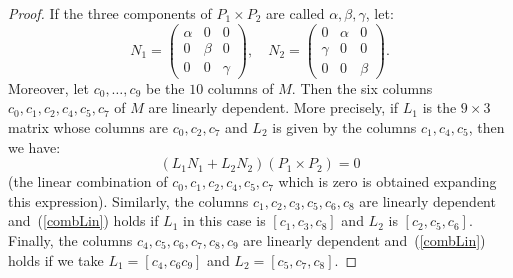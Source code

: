 \documentclass{amsart}
\theoremstyle{plain}
\theoremstyle{definition}
\begin{document}
\begin{proof}
If the three components of $P_1 \times P_2$ are called $\alpha, \beta, \gamma$, let:
%
\[
  N_1 = \left(
  \begin{array}{ccc}
    \alpha & 0 & 0 \\
    0 & \beta & 0\\
    0 & 0 & \gamma
  \end{array}
  \right), \quad
  N_2 = \left(
  \begin{array}{ccc}
    0 & \alpha & 0 \\
    \gamma & 0 & 0\\
    0 & 0 & \beta
  \end{array}
  \right).
\]
%
Moreover, let $c_0, \dots, c_9$ be the $10$ columns of $M$. Then the six
columns $c_0, c_1, c_2, c_4, c_5, c_7$ of $M$ are linearly dependent. More
precisely, if $L_1$ is the $9\times 3$ matrix whose columns are
$c_0, c_2, c_7$ and $L_2$ is given by the columns $c_1, c_4, c_5$,
then we have:
%
\begin{equation}
  (L_1 N_1 + L_2N_2) (P_1 \times P_2) = 0
  \label{combLin}
\end{equation}
%
(the linear combination of $c_0, c_1, c_2, c_4, c_5, c_7$ which is zero
is obtained expanding this expression).
Similarly, the columns $c_1, c_2, c_3, c_5, c_6, c_8$ are linearly dependent
and~(\ref{combLin}) holds if $L_1$ in this case is $[c_1, c_3, c_8]$ and
$L_2$ is $[c_2, c_5, c_6]$. Finally, the columns
$c_4, c_5, c_6, c_7, c_8, c_9$ are linearly dependent and~(\ref{combLin})
holds if we take $L_1 = [c_4, c_6 c_9]$ and $L_2 = [c_5, c_7, c_8]$.


\end{proof}
\end{document}
